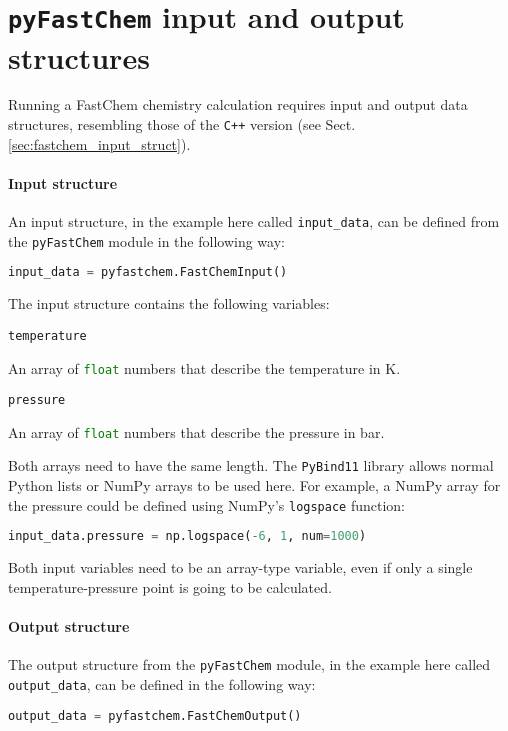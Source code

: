 \documentclass[numbers=noenddot]{aux/fcmanual}
\newcommand{\pfc}{\texttt{pyFastChem}\xspace}
\newcommand{\cpp}{\ttt{C++}\xspace}
\newcommand{\pb}{\texttt{PyBind11}\xspace}
\newcommand{\ttt}[1]{\texttt {#1}}
\begin{document}
\section{\pfc input and output structures}
\label{sec:pfc_input_ouput_struct}

Running a FastChem chemistry calculation requires input and output data structures, resembling those of the \cpp version (see Sect. \ref{sec:fastchem_input_struct}). 

\paragraph{Input structure}
An input structure, in the example here called \lstinline!input_data!, can be defined from the \pfc module in the following way:
\begin{lstlisting}[language=Python]
  input_data = pyfastchem.FastChemInput()
\end{lstlisting}

The input structure contains the following variables:

\bigbreak

\lstinline[language=Python]!temperature!
\begin{addmargin}[25pt]{0pt}
	An array of \lstinline[language=Python]!float! numbers that describe the temperature in K.
\end{addmargin}

\bigbreak

\lstinline[language=Python]!pressure!
\begin{addmargin}[25pt]{0pt}
	An array of \lstinline[language=Python]!float! numbers that describe the pressure in bar.
\end{addmargin}

\bigbreak

Both arrays need to have the same length. The \pb library allows normal Python lists or NumPy arrays to be used here. For example, a NumPy array for the pressure could be defined using NumPy's \lstinline!logspace! function:

\begin{lstlisting}[language=Python]
  input_data.pressure = np.logspace(-6, 1, num=1000)
\end{lstlisting}
Both input variables need to be an array-type variable, even if only a single temperature-pressure point is going to be calculated.

\paragraph{Output structure}
The output structure from the \pfc module, in the example here called \lstinline!output_data!, can be defined in the following way:
\begin{lstlisting}[language=Python]
  output_data = pyfastchem.FastChemOutput()
\end{lstlisting}
\end{document}
